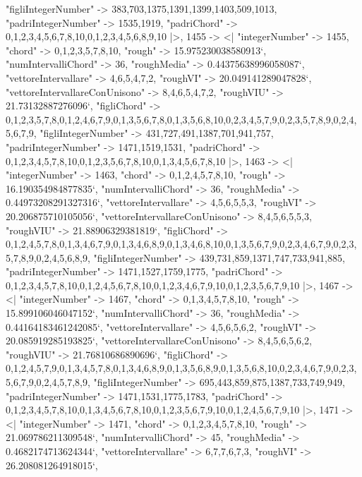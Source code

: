 \documentclass[
]{article}
\begin{document}
\begin{DatasetVerbatim}
    "figliIntegerNumber" -> {383,703,1375,1391,1399,1403,509,1013},
    "padriIntegerNumber" -> {1535,1919},
    "padriChord" -> {{0,1,2,3,4,5,6,7,8,10},{0,1,2,3,4,5,6,8,9,10}}
  |>,
  1455 -> <|
    "integerNumber" -> 1455,
    "chord" -> {0,1,2,3,5,7,8,10},
    "rough" -> 15.975230038580913`,
    "numIntervalliChord" -> 36,
    "roughMedia" -> 0.44375638996058087`,
    "vettoreIntervallare" -> {4,6,5,4,7,2},
    "roughVI" -> 20.049141289047828`,
    "vettoreIntervallareConUnisono" -> {8,4,6,5,4,7,2},
    "roughVIU" -> 21.73132887276096`,
    "figliChord" -> {{0,1,2,3,5,7,8},{0,1,2,4,6,7,9},{0,1,3,5,6,7,8},{0,1,3,5,6,8,10},{0,2,3,4,5,7,9},{0,2,3,5,7,8,9},{0,2,4,5,6,7,9}},
    "figliIntegerNumber" -> {431,727,491,1387,701,941,757},
    "padriIntegerNumber" -> {1471,1519,1531},
    "padriChord" -> {{0,1,2,3,4,5,7,8,10},{0,1,2,3,5,6,7,8,10},{0,1,3,4,5,6,7,8,10}}
  |>,
  1463 -> <|
    "integerNumber" -> 1463,
    "chord" -> {0,1,2,4,5,7,8,10},
    "rough" -> 16.190354984877835`,
    "numIntervalliChord" -> 36,
    "roughMedia" -> 0.44973208291327316`,
    "vettoreIntervallare" -> {4,5,6,5,5,3},
    "roughVI" -> 20.206875710105056`,
    "vettoreIntervallareConUnisono" -> {8,4,5,6,5,5,3},
    "roughVIU" -> 21.88906329381819`,
    "figliChord" -> {{0,1,2,4,5,7,8},{0,1,3,4,6,7,9},{0,1,3,4,6,8,9},{0,1,3,4,6,8,10},{0,1,3,5,6,7,9},{0,2,3,4,6,7,9},{0,2,3,5,7,8,9},{0,2,4,5,6,8,9}},
    "figliIntegerNumber" -> {439,731,859,1371,747,733,941,885},
    "padriIntegerNumber" -> {1471,1527,1759,1775},
    "padriChord" -> {{0,1,2,3,4,5,7,8,10},{0,1,2,4,5,6,7,8,10},{0,1,2,3,4,6,7,9,10},{0,1,2,3,5,6,7,9,10}}
  |>,
  1467 -> <|
    "integerNumber" -> 1467,
    "chord" -> {0,1,3,4,5,7,8,10},
    "rough" -> 15.899106046047152`,
    "numIntervalliChord" -> 36,
    "roughMedia" -> 0.44164183461242085`,
    "vettoreIntervallare" -> {4,5,6,5,6,2},
    "roughVI" -> 20.085919285193825`,
    "vettoreIntervallareConUnisono" -> {8,4,5,6,5,6,2},
    "roughVIU" -> 21.76810686890696`,
    "figliChord" -> {{0,1,2,4,5,7,9},{0,1,3,4,5,7,8},{0,1,3,4,6,8,9},{0,1,3,5,6,8,9},{0,1,3,5,6,8,10},{0,2,3,4,6,7,9},{0,2,3,5,6,7,9},{0,2,4,5,7,8,9}},
    "figliIntegerNumber" -> {695,443,859,875,1387,733,749,949},
    "padriIntegerNumber" -> {1471,1531,1775,1783},
    "padriChord" -> {{0,1,2,3,4,5,7,8,10},{0,1,3,4,5,6,7,8,10},{0,1,2,3,5,6,7,9,10},{0,1,2,4,5,6,7,9,10}}
  |>,
  1471 -> <|
    "integerNumber" -> 1471,
    "chord" -> {0,1,2,3,4,5,7,8,10},
    "rough" -> 21.069786211309548`,
    "numIntervalliChord" -> 45,
    "roughMedia" -> 0.4682174713624344`,
    "vettoreIntervallare" -> {6,7,7,6,7,3},
    "roughVI" -> 26.208081264918015`,

\end{DatasetVerbatim}
\end{document}
